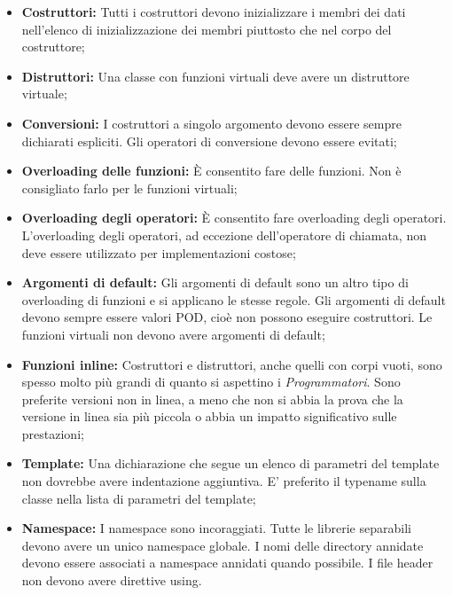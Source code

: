 \documentclass[../NomeDocumento.tex]{subfiles}
\begin{document}
\begin{itemize}
		\item \textbf{Costruttori:} Tutti i costruttori devono inizializzare i membri dei dati nell'elenco di inizializzazione dei membri piuttosto che nel corpo del costruttore;
		
		\item \textbf{Distruttori:} Una classe con funzioni virtuali deve avere un distruttore virtuale;
		
		\item \textbf{Conversioni:} I costruttori a singolo argomento devono essere sempre dichiarati espliciti.		
		Gli operatori di conversione devono essere evitati;
		
		\item \textbf{Overloading delle funzioni:} È consentito fare  delle funzioni. Non è consigliato farlo per le funzioni virtuali;
		
		\item \textbf{Overloading degli operatori:} È consentito fare overloading degli operatori. L'overloading degli operatori, ad eccezione dell'operatore di chiamata, non deve essere utilizzato per implementazioni costose;
		
		\item \textbf{Argomenti di default:} Gli argomenti di default sono un altro tipo di overloading di funzioni e si applicano le stesse regole. Gli argomenti di default devono sempre essere valori POD, cioè non possono eseguire costruttori. Le funzioni virtuali non devono avere argomenti di default;
		
		\item \textbf{Funzioni inline:} Costruttori e distruttori, anche quelli con corpi vuoti, sono spesso molto più grandi di quanto si aspettino i \textit{Programmatori}. Sono preferite versioni non in linea, a meno che non si abbia la prova che la versione in linea sia più piccola o abbia un impatto significativo sulle prestazioni;
		
		\item \textbf{Template:} Una dichiarazione che segue un elenco di parametri del template non dovrebbe avere indentazione aggiuntiva.
		E' preferito il typename sulla classe nella lista di parametri del template;
		
		\item \textbf{Namespace:} I namespace sono incoraggiati. Tutte le librerie separabili devono avere un unico namespace globale. I nomi delle directory annidate devono essere associati a namespace annidati quando possibile.		
		I file header non devono avere direttive using.
		

\end{itemize}
\end{document}
